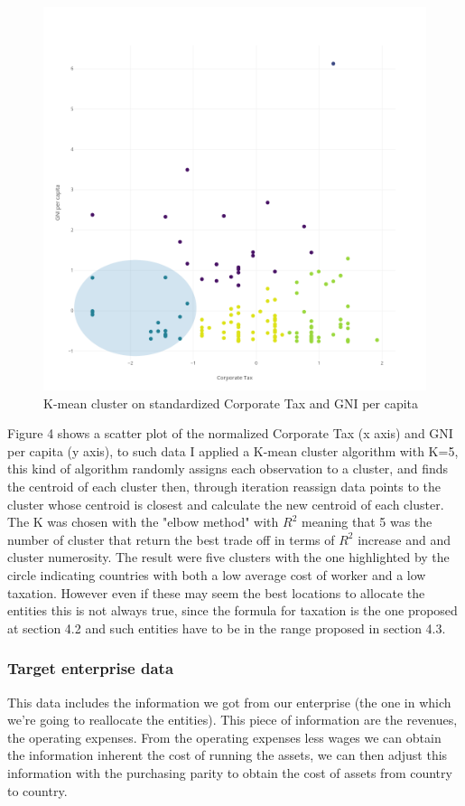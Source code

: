 \documentclass{article}
\begin{document}
\begin{figure}[ht]
\centering
\includegraphics[width=0.8\linewidth]{Images/Cluster-GNI-CT.png}
\caption{K-mean cluster on standardized Corporate Tax and GNI per capita}
\end{figure}

Figure 4 shows a scatter plot of the normalized Corporate Tax (x axis) and GNI per capita (y axis), to such data I applied a K-mean cluster algorithm with K=5, this kind of algorithm randomly assigns each observation to a cluster, and finds the centroid of each cluster then, through iteration reassign data points to the cluster whose centroid is closest and calculate the new centroid of each cluster. The K was chosen with the "elbow method" with $R^2$ meaning that 5 was the number of cluster that return the best trade off in terms of $R^2$ increase and and cluster numerosity.
The result were five clusters with the one highlighted by the circle indicating countries with both a low average cost of worker and a low taxation. However even if these may seem the best locations to allocate the entities this is not always true, since the formula for taxation is the one proposed at section 4.2 and such entities have to be in the range proposed in section 4.3.

\subsubsection{Target enterprise data}
This data includes the information we got from our enterprise (the one in which we're going to reallocate the entities). This piece of information are the revenues, the operating expenses. From the operating expenses less wages we can obtain the information inherent the cost of running the assets\cite{williams_financial_2008}, we can then adjust this information with the purchasing parity to obtain the cost of assets from country to country.
\end{document}
